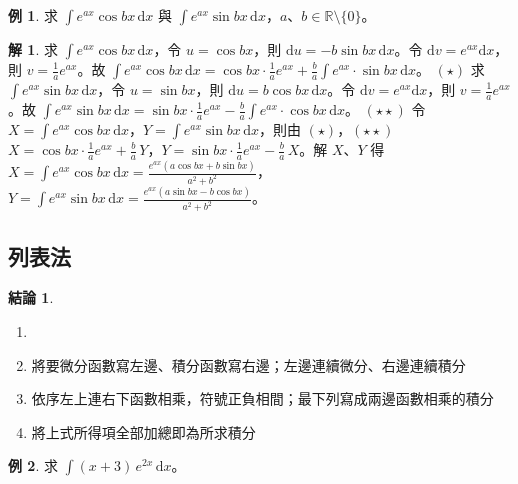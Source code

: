 \documentclass[12pt]{extarticle}
\newcommand{\ds}{\displaystyle}
\theoremstyle{definition}
\newtheorem*{fact}{結論}
\newtheorem*{ex}{例}
\newtheorem*{sol}{解}
\begin{document}
\begin{ex}
  求 $\ds\int e^{ax}\cos bx\,\mathrm{d}x$ 與 $\ds\int e^{ax}\sin bx\,\mathrm{d}x$，$a$、$b\in\mathbb{R}\setminus\{0\}$。
\end{ex}

\begin{sol}
  求 $\ds\int e^{ax}\cos bx\,\mathrm{d}x$，令 $\ds u = \cos bx$，則 $\ds\mathrm{d}u = -b\sin bx\,\mathrm{d}x$。令 $\ds\mathrm{d}v = e^{ax}\mathrm{d}x$，則 $\ds v = \frac{1}{a}e^{ax}$。故 $\ds\int e^{ax}\cos bx\,\mathrm{d}x = \cos bx\cdot \frac{1}{a}e^{ax} + \frac{b}{a}\int e^{ax}\cdot\sin bx\,\mathrm{d}x$。 $(\star)$
  求 $\ds\int e^{ax}\sin bx\,\mathrm{d}x$，令 $\ds u = \sin bx$，則 $\ds\mathrm{d}u = b\cos bx\,\mathrm{d}x$。令 $\ds\mathrm{d}v = e^{ax}\mathrm{d}x$，則 $\ds v = \frac{1}{a}e^{ax}$。故 $\ds\int e^{ax}\sin bx\,\mathrm{d}x = \sin bx\cdot \frac{1}{a}e^{ax} - \frac{b}{a}\int e^{ax}\cdot\cos bx\,\mathrm{d}x$。 $(\star\star)$
令 $\ds X = \int e^{ax}\cos bx\,\mathrm{d}x$，$\ds Y = \int e^{ax}\sin bx\,\mathrm{d}x$，則由 $\ds(\star)$，$\ds(\star\star)$ $\ds X = \cos bx\cdot\frac{1}{a}e^{ax} + \frac{b}{a}\,Y$，$\ds Y = \sin bx\cdot\frac{1}{a}e^{ax} - \frac{b}{a}\,X$。解 $X$、$Y$ 得 $\ds X = \int e^{ax}\cos bx\,\mathrm{d}x = \frac{e^{ax}(a\cos bx + b\sin bx)}{a^2 + b^2}$，$\ds Y = \int e^{ax}\sin bx\,\mathrm{d}x = \frac{e^{ax}(a\sin bx - b\cos bx)}{a^2 + b^2}$。
\end{sol}

\subsection*{列表法}

\begin{fact}
  \begin{enumerate}\setlength\itemsep{0em}
    \item[]
    \item 將要微分函數寫左邊、積分函數寫右邊；左邊連續微分、右邊連續積分
    \item 依序左上連右下函數相乘，符號正負相間；最下列寫成兩邊函數相乘的積分
    \item 將上式所得項全部加總即為所求積分
  \end{enumerate}
\end{fact}

\begin{ex}
  求 $\ds\int (x + 3)\,e^{2x}\,\mathrm{d}x$。
\end{ex}
\end{document}
